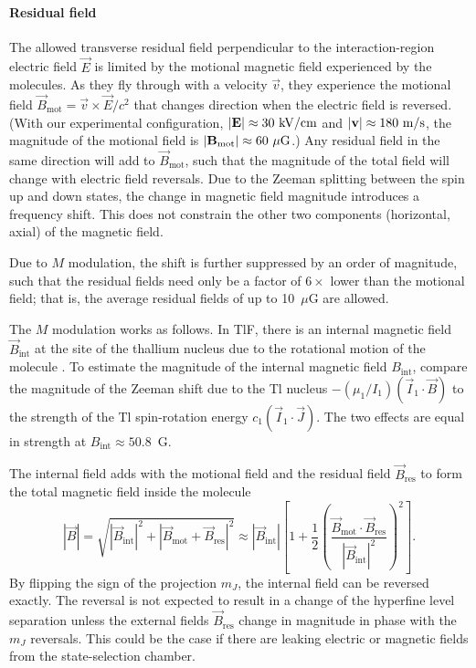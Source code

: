 \paragraph{Residual field}

The allowed transverse residual field perpendicular to the interaction-region
electric field $\vec E$ is limited by the motional magnetic field experienced by
the molecules. As they fly through with a velocity $\vec v$, they experience the
motional field $\vec B_\text{mot}=\vec v\times\vec E/c^2$ that changes direction
when the electric field is reversed. (With our experimental configuration,
$|\mathbf{E}|\approx30~\mathrm{kV/cm}$ and $|\mathbf{v}|\approx180~\mathrm{m/s}$, the magnitude of the
motional field is $|\mathbf{B}_\text{mot}|\approx60~\mu\mathrm{G}$.) Any residual field in the
same direction will add to $\vec B_\text{mot}$, such that the magnitude of the
total field will change with electric field reversals. Due to the Zeeman
splitting between the spin up and down states, the change in magnetic field
magnitude introduces a frequency shift. This does not constrain the other two
components (horizontal, axial) of the magnetic field.

Due to $M$ modulation, the shift is further suppressed by an order of
magnitude, such that the residual fields need only be a factor of $6\times$
lower than the motional field; that is, the average residual fields of up to
10~$\mu$G are allowed.

The $M$ modulation works as follows. In TlF, there is an internal magnetic field
$\vec B_\text{int}$ at the site of the thallium nucleus due to the rotational
motion of the molecule \cite{cho1991search}. To estimate the magnitude of the
internal magnetic field $B_\text{int}$, compare the magnitude of the Zeeman
shift due to the Tl nucleus $-(\mu_1/I_1)(\vec I_1\cdot\vec B)$ to the strength
of the Tl spin-rotation energy $c_1(\vec I_1\cdot\vec J)$. The two effects are
equal in strength at $B_\text{int}\approx50.8$~G.

The internal field adds with the motional field and the residual field $\vec
B_\text{res}$ to form the total magnetic field inside the molecule
%
\[
   |\vec B|=\sqrt{|\vec B_\text{int}|^2 + |\vec B_\text{mot}+\vec
   B_\text{res}|^2}
   \approx|\vec B_\text{int}|\left[1+\frac{1}{2}\left(\frac{\vec
   B_\text{mot}\cdot\vec B_\text{res}}{|\vec B_\text{int}|^2}\right)^2\right].
\]
%
By flipping the sign of the projection $m_J$, the internal field can be reversed
exactly. The reversal is not expected to result in a change of the hyperfine
level separation unless the external fields $\vec B_\text{res}$ change in
magnitude in phase with the $m_J$ reversals. This could be the case if there are
leaking electric or magnetic fields from the state-selection chamber.

